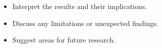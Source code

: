 \begin{itemize}
        \item Interpret the results and their implications.
        \item Discuss any limitations or unexpected findings.
        \item Suggest areas for future research.
    \end{itemize}